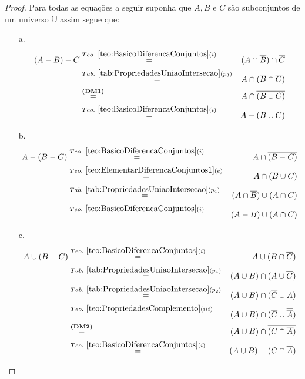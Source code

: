\begin{proof}
	Para todas as equações a seguir suponha que $A, B$ e $C$ são subconjuntos de um universo $\mathbb{U}$ assim segue que:
	\begin{itemize}
		\item[a.] 
		\begin{eqnarray*}
			(A - B) - C & \stackrel{Teo. \  \ref{teo:BasicoDiferencaConjuntos}(i)}{=} & (A \cap \overline{B}) \cap \overline{C}\\
			& \stackrel{Tab. \ \ref{tab:PropriedadesUniaoIntersecao}(p_3)}{=} & A \cap (\overline{B} \cap \overline{C})\\
			& \stackrel{\textbf{(DM1)}}{=} & A \cap \overline{(B \cup C)}\\
			& \stackrel{Teo. \  \ref{teo:BasicoDiferencaConjuntos}(i)}{=} & A - (B \cup C)
		\end{eqnarray*}
		\item[b.]
		\begin{eqnarray*}
			A - (B - C) & \stackrel{Teo. \  \ref{teo:BasicoDiferencaConjuntos}(i)}{=} & A \cap \overline{(B - C)} \\
			& \stackrel{Teo. \ \ref{teo:ElementarDiferencaConjuntos1}(e)}{=} & A \cap (\overline{B} \cup C)\\
			& \stackrel{Tab. \ \ref{tab:PropriedadesUniaoIntersecao}(p_4)}{=} & (A \cap \overline{B}) \cup (A \cap C)\\
			& \stackrel{Teo. \  \ref{teo:BasicoDiferencaConjuntos}(i)}{=} & (A - B) \cup (A \cap C)
		\end{eqnarray*} 
		\item[c.] 
		\begin{eqnarray*}
			A \cup (B - C) & \stackrel{Teo. \  \ref{teo:BasicoDiferencaConjuntos}(i)}{=} & A \cup (B \cap \overline{C})\\
			& \stackrel{Tab. \ \ref{tab:PropriedadesUniaoIntersecao}(p_4)}{=} &  (A \cup B) \cap (A \cup \overline{C})\\
			& \stackrel{Tab. \ \ref{tab:PropriedadesUniaoIntersecao}(p_2)}{=} & (A \cup B) \cap (\overline{C} \cup A)\\
			& \stackrel{Teo. \ \ref{teo:PropriedadesComplemento}(iii)}{=}& (A \cup B) \cap (\overline{C} \cup \overline{\overline{A}})\\
			& \stackrel{\textbf{(DM2)}}{=}& (A \cup B) \cap \overline{(C \cap \overline{A})}\\
			& \stackrel{Teo. \  \ref{teo:BasicoDiferencaConjuntos}(i)}{=}& (A \cup B) - (C \cap \overline{A})\\

\end{eqnarray*}
\end{itemize}
\end{proof}
